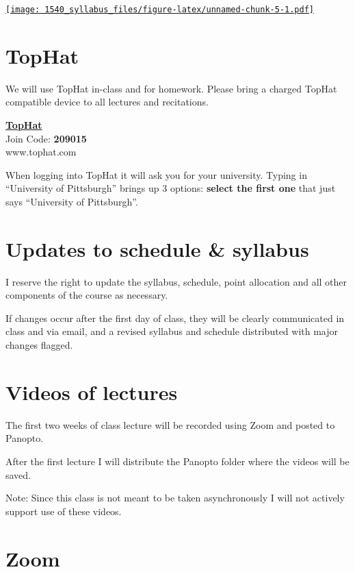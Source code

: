 \documentclass[
]{book}
\begin{document}
\href{https://docs.google.com/spreadsheets/d/12ryH_WBJadioURhMu9HHSO1NxyBA6f9QAuTdasXkY3Y/edit?usp=sharing}{\texttt{[image: 1540\_syllabus\_files/figure-latex/unnamed-chunk-5-1.pdf]}}

\hypertarget{tophat}{%
\chapter{TopHat}\label{tophat}}

We will use TopHat in-class and for homework. Please bring a charged TopHat compatible device to all lectures and recitations.

\href{www.tophat.com}{\textbf{TopHat}}\\
Join Code: \textbf{209015}\\
www.tophat.com

When logging into TopHat it will ask you for your university. Typing in ``University of Pittsburgh'' brings up 3 options: \textbf{select the first one} that just says ``University of Pittsburgh''.

\hypertarget{updates-to-schedule-syllabus}{%
\chapter{Updates to schedule \& syllabus}\label{updates-to-schedule-syllabus}}

I reserve the right to update the syllabus, schedule, point allocation and all other components of the course as necessary.

If changes occur after the first day of class, they will be clearly communicated in class and via email, and a revised syllabus and schedule distributed with major changes flagged.

\hypertarget{videos-of-lectures}{%
\chapter{Videos of lectures}\label{videos-of-lectures}}

The first two weeks of class lecture will be recorded using Zoom and posted to Panopto.

After the first lecture I will distribute the Panopto folder where the videos will be saved.

Note: Since this class is not meant to be taken asynchronously I will not actively support use of these videos.

\hypertarget{zoom}{%
\chapter{Zoom}\label{zoom}}
\end{document}
